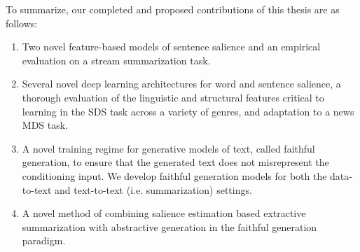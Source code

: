 To summarize, our completed and proposed contributions of this thesis are as 
follows:
\begin{enumerate}

 \item Two novel feature-based models of sentence salience and an empirical
    evaluation on a stream summarization task.


 \item Several novel deep learning architectures for word and sentence 
   salience, a thorough evaluation of the linguistic and
   structural features critical to learning in the SDS task across a 
   variety of genres, and adaptation to a news MDS task. 


 \item A novel training regime for generative models of text, 
     called faithful generation, to ensure that the generated text does
     not misrepresent the conditioning input. We develop faithful generation
     models for both the data-to-text and text-to-text (i.e. summarization)
     settings.

 \item A novel method of combining salience estimation based extractive 
     summarization with abstractive generation in the faithful generation
    paradigm.    




\end{enumerate}












